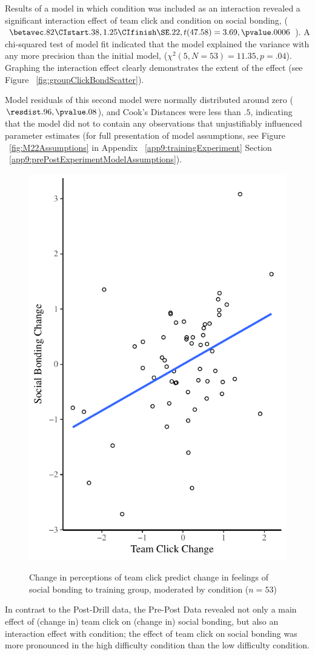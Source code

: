 Results of a model in which condition was included as an interaction revealed a significant interaction effect of team click and condition on social bonding, ($\betavec .82 \CIstart .38, 1.25 \CIfinish \SE .22, t(47.58) = 3.69, \pvalue .0006$).  A chi-squared test of model fit indicated that the model explained the variance with any more precision than the initial model, ($\chi^2 (5, N = 53) = 11.35, p = .04$).  Graphing the interaction effect clearly demonstrates the extent of the effect (see Figure ~\ref{fig:groupClickBondScatter}).

Model residuals of this second model were normally distributed around zero ($\resdist .96, \pvalue .08$), and Cook's Distances were less than $.5$, indicating that the model did not to contain any observations that unjustifiably influenced parameter estimates (for full presentation of model assumptions, see Figure ~\ref{fig:M22Assumptions} in Appendix ~\ref{app9:trainingExperiment} Section ~\ref{app9:prePostExperimentModelAssumptions}).




\begin{figure}
  \centering
    \includegraphics[width=0.5\linewidth,keepaspectratio] {images/groupClickBondingChangeCondition}
    \label{fig:groupClickBondingChangeCondition}
    \caption{Change in perceptions of team click predict change in feelings of social bonding to training group, moderated by condition ($n = 53$)}
\end{figure}

In contrast to the Post-Drill data, the Pre-Post Data revealed not  only a main effect of (change in) team click on (change in) social bonding, but also an interaction effect with condition; the effect of team click on social bonding was more pronounced in the high difficulty condition than the low difficulty condition.


